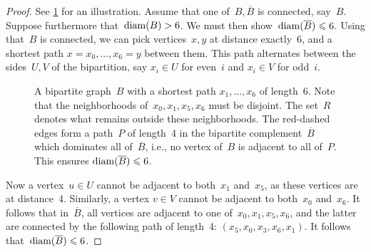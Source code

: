 \documentclass[a4paper,UKenglish,cleveref, autoref, thm-restate]{lipics-v2021}
\newcommand{\diam}{\textnormal{diam}}
\renewcommand{\le}{\leqslant}
\begin{document}
\begin{proof} See \cref{fig:bicomplement-diam} for an illustration.
  Assume that one of~$B,\overline{B}$ is connected, say~$B$.
  Suppose furthermore that~$\diam(B) > 6$. We must then show~$\diam(\overline{B}) \le 6$.
  Using that~$B$ is connected, we can pick vertices~$x,y$ at distance exactly~6,
  and a shortest path $x = x_0, \dots, x_6 = y$ between them.
  This path alternates between the sides~$U,V$ of the bipartition, say $x_i \in U$ for even~$i$ and $x_i \in V$ for odd~$i$.

  \begin{figure}[ht]
    \centering
    \caption{A bipartite graph~$B$ with a shortest path $x_1,\dots,x_6$ of length~$6$.
      Note that the neighborhoods of~$x_0,x_1,x_5,x_6$ must be disjoint.
      The set~$R$ denotes what remains outside these neighborhoods.
      The red-dashed edges form a path~$P$ of length~4 in the bipartite complement~$\overline{B}$ which dominates all of~$\overline{B}$,
      i.e., no vertex of~$B$ is adjacent to all of~$P$.
      This ensures $\diam(\overline{B}) \le 6$.
    }
    \label{fig:bicomplement-diam}
  \end{figure}

  Now a vertex~$u \in U$ cannot be adjacent to both~$x_1$ and~$x_5$, as these vertices are at distance~$4$.
  Similarly, a vertex $v \in V$ cannot be adjacent to both~$x_0$ and~$x_6$.
  It follows that in~$\overline{B}$, all vertices are adjacent to one of~$x_0,x_1,x_5,x_6$,
  and the latter are connected by the following path of length~4: $(x_5,x_0,x_3,x_6,x_1)$.
  It follows that~$\diam(\overline{B}) \le 6$.
\end{proof}
\end{document}
